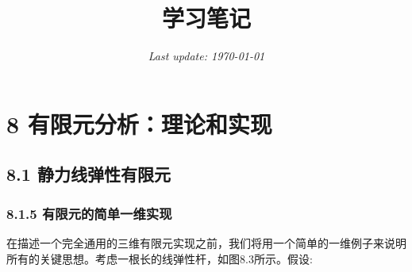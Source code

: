 \documentclass[12pt,a3paper]{book}
\title{\LARGE\bfseries\songti 学习笔记}
\date{\small\itshape Last update: \today}
\begin{document}
\kaishu

\maketitle 
\clearpage

\tableofcontents  
\clearpage




\clearpage
\chapter*{8 有限元分析：理论和实现}

\section*{8.1 静力线弹性有限元}


\subsection*{8.1.5 有限元的简单一维实现}


在描述一个完全通用的三维有限元实现之前，我们将用一个简单的一维例子来说明所有的关键思想。考虑一根长的线弹性杆，如图8.3所示。假设:















\end{document}
